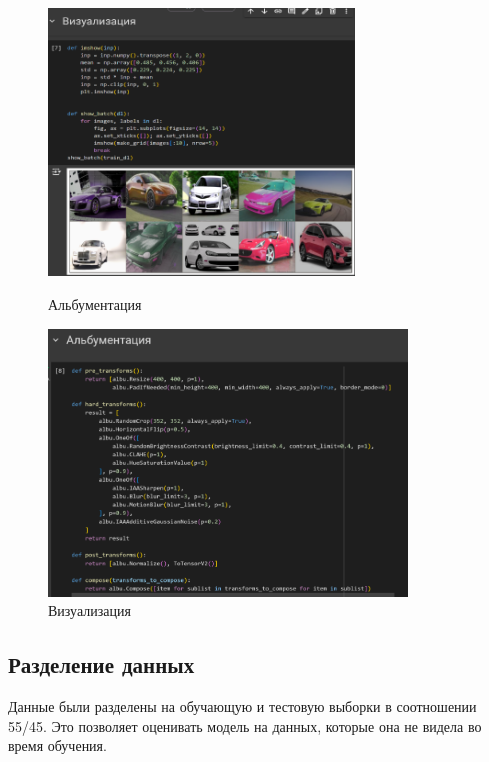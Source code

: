 \documentclass[14pt]{extarticle}
\begin{document}
\begin{figure}[H]
\centering
\begin{minipage}{0.49\textwidth}
  \centering
  \includegraphics[height=7.1cm]{images/2.png}  
  \caption{Альбументация}
  \label{fig:12}
\end{minipage}
\hfill
\begin{minipage}{0.49\textwidth}
  \centering
  \includegraphics[height=7.1cm]{images/3.png}  
  \caption{Визуализация}
  \label{fig:13}
\end{minipage}
\end{figure}

\subsection{Разделение данных}
\hspace{1cm}Данные были разделены на обучающую и тестовую выборки в соотношении 55/45. Это позволяет оценивать модель на данных, которые она не видела во время обучения.
\end{document}
